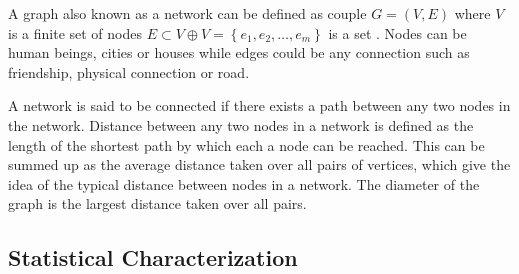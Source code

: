 A graph also known as a network can be defined as couple $G = (V, E) $ where $V$ is a finite set of nodes $E \subset V \oplus V = \left\lbrace e_1,e_2,\dots, e_m \right\rbrace$ is a set \citep{estrada2012structure}. Nodes can be human beings, cities or houses while edges could be any connection such as friendship, physical connection or road.

A network is said to be connected if there exists a path between any two nodes in the network. Distance between any two nodes in a network is defined as the length of the shortest path by which each a node can be reached. This can be summed up as the average distance taken over all pairs of vertices, which give the idea of the typical distance between nodes in a network. The diameter of the graph is the largest distance taken over all pairs.

\subsection{Statistical Characterization}
 

